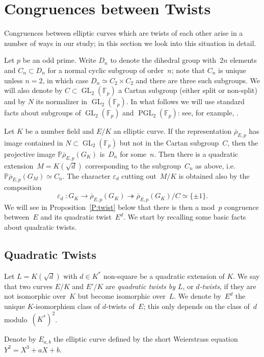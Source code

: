 \documentclass[12pt, reqno]{amsart}
\newcommand{\F}{\mathbb{F}}
\newcommand{\PP}{\mathbb{P}}
\newcommand{\rhobar}{{\overline{\rho}}}
\newcommand{\eps}{\varepsilon}
\newcommand{\GL}{\operatorname{GL}}
\newcommand{\PGL}{\operatorname{PGL}}
\numberwithin{equation}{section}
\theoremstyle{definition}
\theoremstyle{remark}
\begin{document}
\section{Congruences between Twists}

Congruences between elliptic curves which are twists of each other arise in a number of ways in our study; in this section we look into this situation in detail.

Let $p$ be an odd prime. Write $D_{n}$ to denote the dihedral group
with~$2n$ elements and $C_n \subset D_{n}$ for a normal cyclic
subgroup of order~$n$; note that $C_n$ is unique unless $n=2$, in
which case $D_{n} \simeq C_2 \times C_2$ and there are three such
subgroups.  We will also denote by $C \subset \GL_2(\F_p)$ a Cartan
subgroup (either split or non-split) and by $N$ its normalizer in
$\GL_2(\F_p)$.  In what follows we will use standard facts about
subgroups of $\GL_2(\F_p)$ and $\PGL_2(\F_p)$: see, for example,
\cite[Theorem XI.2.3]{LangModForms}.

Let $K$ be a number field and $E/K$ an elliptic curve. If the
representation $\rhobar_{E,p}$ has image contained in $N \subset
\GL_2(\F_p)$ but not in the Cartan subgroup~$C$, then the projective
image $\PP \rhobar_{E,p}(G_K)$ is~$D_{n}$ for some~$n$. Then there is
a quadratic extension~$M = K(\sqrt{d})$ corresponding to the
subgroup~$C_n$ as above, i.e. $\PP \rhobar_{E,p}(G_M) \simeq C_n$. The
character $\eps_d$ cutting out~$M/K$ is obtained also by the
composition
\[
 \eps_d \; : G_K \to \rhobar_{E,p}(G_K) \twoheadrightarrow \rhobar_{E,p}(G_K)/C \simeq \{\pm 1 \}.
\]
We will see in Proposition~\ref{P:twist} below that there is then a
mod~$p$ congruence between~$E$ and its quadratic twist~$E^d$.  We
start by recalling some basic facts about quadratic twists.

\subsection{Quadratic Twists}

Let $L=K(\sqrt{d})$ with $d\in K^*$ non-square be a quadratic
extension of $K$.  We say that two curves $E/K$ and $E'/K$ are {\em
  quadratic twists by $L$}, or {\em $d$-twists}, if they are not
isomorphic over~$K$ but become isomorphic over~$L$.  We denote
by~$E^d$ the unique $K$-isomorphism class of $d$-twists of~$E$; this
only depends on the class of~$d$ modulo~$(K^*)^2$.

Denote by $E_{a,b}$ the elliptic curve defined by the short
Weierstrass equation $Y^2=X^3+aX+b$.
\end{document}
